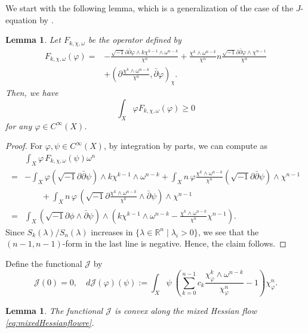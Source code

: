 \documentclass{amsart}
\numberwithin{equation}{section}
\theoremstyle{plain}
\newtheorem{lem}[equation]{Lemma}
\theoremstyle{definition}
\theoremstyle{remark}
\newcommand{\delb}{\sqrt{-1}\partial\bar{\partial}}
\begin{document}
We start with the following lemma, which is a generalization of the case of the $J$-equation by \cite[Lemma 1]{Hashimoto}.

\begin{lem}\label{lem:F}
    Let $F_{k,\chi,\omega}$ be the operator defined by
    \begin{align*}
        F_{k,\chi,\omega}(\varphi)=&-\frac{\delb \varphi\wedge k\chi^{k-1}\wedge\omega^{n-k}}{\chi^n}+\frac{\chi^k\wedge\omega^{n-k}}{\chi^n}n\frac{\delb\varphi\wedge\chi^{n-1}}{\chi^n}\\
        &+\left(\partial\frac{\chi^k\wedge\omega^{n-k}}{\chi^n},\bar{\partial}\varphi\right)_{\chi}.
    \end{align*}
    Then, we have 
    $$\int_X\varphi F_{k,\chi,\omega}(\varphi)\ge0$$
    for any $\varphi\in C^\infty(X)$.
\end{lem}

\begin{proof}
For $\varphi,\psi\in C^\infty(X)$, by integration by parts, we can compute as
\begin{align*}
& \int_X {\varphi \, F_{k,\chi,\omega} (\psi)} \omega^{n} \\
=&-\int_X \varphi \left({\sqrt{-1} \partial \bar{\partial} \psi} \right)\wedge k\chi^{k-1} \wedge \omega^{n-k} 
+\int_X n \, \varphi \frac{\chi^k\wedge\omega^{n-k}}{\chi^n} \left( \sqrt{-1} \partial \bar{\partial} \psi \right) \wedge \chi^{n-1} \\
& \qquad + \int_X n \, \varphi \, \left( \sqrt{-1} \partial \frac{\chi^k\wedge\omega^{n-k}}{\chi^k} \wedge \bar{\partial}\psi \right) \wedge \chi^{n-1} \\
= & \int_X \left( \sqrt{-1} \partial \phi \wedge \bar{\partial} \psi \right) \wedge \left(k\chi^{k-1} \wedge \omega^{n-k} -\frac{\chi^k\wedge\omega^{n-k}}{\chi^n} \chi^{n-1}\right).
\end{align*}
Since $S_k(\lambda)/S_n(\lambda)$ increases in $\{\lambda\in\mathbb{R}^n\mid \lambda_i>0\}$, we see that the $(n-1,n-1)$-form in the last line is negative. Hence, the claim follows.
\end{proof}

Define the functional $\mathcal{J}$ by
\begin{equation*}
    \mathcal{J}(0)=0,\quad d\mathcal{J}(\varphi)(\psi):=\int_X\psi\ \left(\sum_{k=0}^{n-1}c_k\frac{\chi_{\varphi}^k\wedge\omega^{n-k}}{\chi_{\varphi}^n}-1\right)\chi_{\varphi}^n.
\end{equation*}

\begin{lem}\label{lem:convexalongflow}
    The functional $\mathcal{J}$ is convex along the mixed Hessian flow \eqref{eq:mixedHessianflowre}.
\end{lem}
\end{document}

